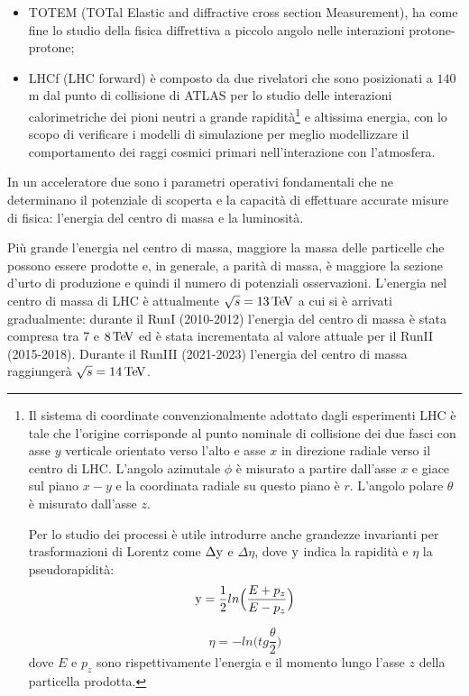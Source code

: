 \begin{itemize}
\item TOTEM (TOTal Elastic and diffractive cross section Measurement), ha come fine lo studio della fisica diffrettiva a piccolo angolo nelle interazioni protone-protone;
\item LHCf (LHC forward) è composto da due rivelatori che sono posizionati a $140$m dal punto di collisione di ATLAS per lo studio delle interazioni calorimetriche dei pioni neutri a grande rapidità\footnote{
Il sistema di coordinate convenzionalmente adottato dagli esperimenti LHC è tale che l'origine corrisponde al punto nominale di collisione dei due fasci con asse $y$ verticale orientato verso l'alto e asse $x$ in direzione radiale verso il centro di LHC. L'angolo azimutale $\phi$ è misurato a partire dall'asse $x$ e giace sul piano $x-y$ e la coordinata radiale su questo piano è $r$. L'angolo polare $\theta$ è misurato dall'asse $z$. 

Per lo studio dei processi è utile introdurre anche grandezze invarianti per trasformazioni di Lorentz come $\Delta {\rm y}$ e $\Delta \eta$, dove ${\rm y}$ indica la rapidità e $\eta$ la pseudorapidità:
\begin{equation}
{\rm y} = \dfrac{1}{2} ln\Big( \dfrac{E+p_z}{E-p_z}\Big)
\end{equation}

\begin{equation}
\eta = - ln \Big( tg\frac{\theta}{2}\Big)
\end{equation}
dove $E$ e $p_z$ sono rispettivamente l'energia e il momento lungo l'asse $z$ della particella prodotta. 
} e altissima energia, con lo scopo di verificare i modelli di simulazione per meglio modellizzare il comportamento dei raggi cosmici primari nell'interazione con l'atmosfera.
\end{itemize}

In un acceleratore due sono i parametri operativi fondamentali che ne determinano il potenziale di scoperta e la capacit\`a di effettuare accurate misure di fisica: l'energia del centro di massa e la luminosit\`a.

Pi\`u grande l'energia nel centro di massa, maggiore la massa delle particelle che possono essere prodotte e, in generale, a parit\`a di massa, \`e maggiore la sezione d'urto di produzione e quindi il numero di potenziali osservazioni. L'energia nel centro di massa di LHC \`e attualmente $\sqrt{s}=13{\rm \, Te\kern-0.125em V}$ a cui si \`e arrivati gradualmente: durante il RunI (2010-2012) l'energia del centro di massa \`e stata compresa tra 7 e $8{\rm \, Te\kern-0.125em V}$ ed \`e stata incrementata al valore attuale per il RunII (2015-2018). Durante il RunIII (2021-2023) l'energia del centro di massa raggiunger\`a $\sqrt{s}=14{\rm \, Te\kern-0.125em V}$.

